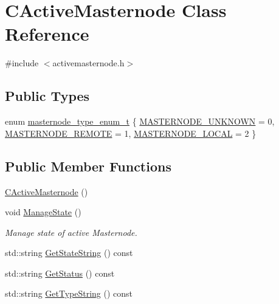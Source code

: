 \hypertarget{class_c_active_masternode}{}\section{C\+Active\+Masternode Class Reference}
\label{class_c_active_masternode}


{\ttfamily \#include $<$activemasternode.\+h$>$}

\subsection*{Public Types}
\begin{DoxyCompactItemize}
\item 
enum \mbox{\hyperlink{class_c_active_masternode_a5fe600c379008561204e609316427bb4}{masternode\+\_\+type\+\_\+enum\+\_\+t}} \{ \mbox{\hyperlink{class_c_active_masternode_a5fe600c379008561204e609316427bb4ab4ebeeb59995d51e3e2496f6641368c1}{M\+A\+S\+T\+E\+R\+N\+O\+D\+E\+\_\+\+U\+N\+K\+N\+O\+WN}} = 0, 
\mbox{\hyperlink{class_c_active_masternode_a5fe600c379008561204e609316427bb4a6900162a70bc2be4012ec755701ec373}{M\+A\+S\+T\+E\+R\+N\+O\+D\+E\+\_\+\+R\+E\+M\+O\+TE}} = 1, 
\mbox{\hyperlink{class_c_active_masternode_a5fe600c379008561204e609316427bb4a481e09274e6ffc3c0d4ebd06e805ad30}{M\+A\+S\+T\+E\+R\+N\+O\+D\+E\+\_\+\+L\+O\+C\+AL}} = 2
 \}
\end{DoxyCompactItemize}
\subsection*{Public Member Functions}
\begin{DoxyCompactItemize}
\item 
\mbox{\hyperlink{class_c_active_masternode_a7ffb946d1b2aad0054d3b3efce8c0543}{C\+Active\+Masternode}} ()
\item 
void \mbox{\hyperlink{class_c_active_masternode_aaca6cb8f27b89840b929e286405e5861}{Manage\+State}} ()
\begin{DoxyCompactList}\small\item\em Manage state of active Masternode. \end{DoxyCompactList}\item 
std\+::string \mbox{\hyperlink{class_c_active_masternode_ae213eaf967846069315726ea30120948}{Get\+State\+String}} () const
\item 
std\+::string \mbox{\hyperlink{class_c_active_masternode_affe6a1e6ba472a5d368072411e332476}{Get\+Status}} () const
\item 
std\+::string \mbox{\hyperlink{class_c_active_masternode_a0cdacf7245f997fd68dfcc8f789cdf97}{Get\+Type\+String}} () const
\end{DoxyCompactItemize}
